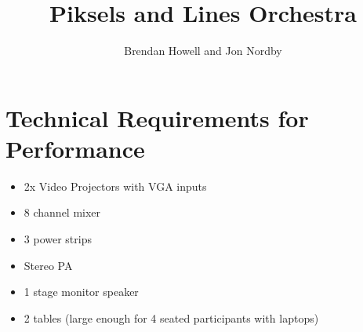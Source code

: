\documentclass{article}
\title{Piksels and Lines Orchestra}
\author{Brendan Howell and Jon Nordby}
\date{}
\begin{document}
\maketitle
\section{Technical Requirements for Performance}

\begin{itemize}
\item 2x Video Projectors with VGA inputs
\item 8 channel mixer
\item 3 power strips
\item Stereo PA
\item 1 stage monitor speaker
\item 2 tables (large enough for 4 seated participants with laptops)
\end{itemize}
\end{document}
